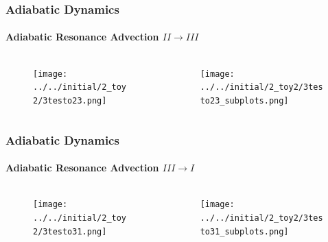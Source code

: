 \documentclass[dvipsnames]{beamer}
\begin{document}
\begin{frame}
    \frametitle{Adiabatic Dynamics}
    \framesubtitle{Adiabatic Resonance Advection $II \to III$}

    \begin{columns}
        \begin{column}{0.5\textwidth}
            \begin{figure}[t]
                \centering
                \texttt{[image: ../../initial/2\_toy2/3testo23.png]}
            \end{figure}
        \end{column}
        \begin{column}{0.5\textwidth}
            \begin{figure}[t]
                \centering
                \texttt{[image: ../../initial/2\_toy2/3testo23\_subplots.png]}
            \end{figure}
        \end{column}
    \end{columns}
\end{frame}

\begin{frame}
    \frametitle{Adiabatic Dynamics}
    \framesubtitle{Adiabatic Resonance Advection $III \to I$}

    \begin{columns}
        \begin{column}{0.5\textwidth}
            \begin{figure}[t]
                \centering
                \texttt{[image: ../../initial/2\_toy2/3testo31.png]}
            \end{figure}
        \end{column}
        \begin{column}{0.5\textwidth}
            \begin{figure}[t]
                \centering
                \texttt{[image: ../../initial/2\_toy2/3testo31\_subplots.png]}
            \end{figure}
        \end{column}
    \end{columns}
\end{frame}
\end{document}
